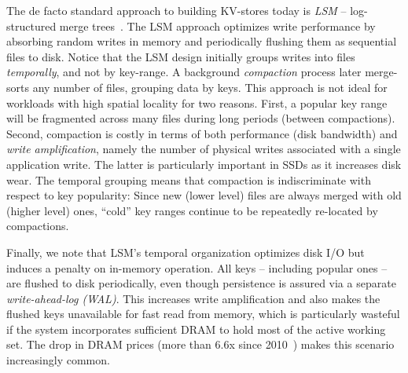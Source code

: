 The de facto standard approach to building KV-stores today is \emph{LSM} -- log-structured merge trees~\cite{DBLP:journals/acta/ONeilCGO96}. 
The LSM approach optimizes write performance by absorbing random writes in memory and periodically flushing 
them as sequential files to disk. %
Notice that the LSM design initially groups writes  into files \emph{temporally}, and not by key-range. 
A background \emph{compaction} process later merge-sorts any number of files, grouping data by keys. 
This approach is not ideal for workloads with high spatial locality for two reasons. 
First, a popular key range will be fragmented across many files during long periods (between compactions). 
Second,  compaction  is costly in terms of  both performance 
(disk bandwidth) and \emph{write amplification}, namely the number of physical writes 
associated with a single application write. The latter is  particularly important in SSDs as it increases disk wear. 
The temporal grouping means that compaction is indiscriminate with respect to key popularity:  
Since new (lower level) files are always merged with old (higher level) ones, 
 ``cold'' key ranges
 continue to be repeatedly re-located
by  compactions.  


Finally, we note that LSM's temporal  organization optimizes disk I/O but induces a penalty on in-memory operation. 
All keys -- including popular ones -- are flushed to disk periodically, even though persistence is assured 
via a separate \emph{write-ahead-log (WAL)}.
This increases write amplification and also makes the flushed keys unavailable for fast read from memory,
which is particularly wasteful if the system incorporates sufficient DRAM to hold most of the active working set. 
The drop in DRAM prices (more than $6.6$x since 2010~\cite{dram-prices})  
makes this scenario increasingly common.  

